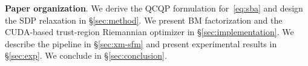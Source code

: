 \textbf{Paper organization}. We derive the QCQP formulation for~\eqref{eq:sba} and design the SDP relaxation in \S\ref{sec:method}. We present BM factorization and the CUDA-based trust-region Riemannian optimizer in \S\ref{sec:implementation}. We describe the \xmsfm pipeline in \S\ref{sec:xm-sfm} and present experimental results in \S\ref{sec:exp}. We conclude in \S\ref{sec:conclusion}.
